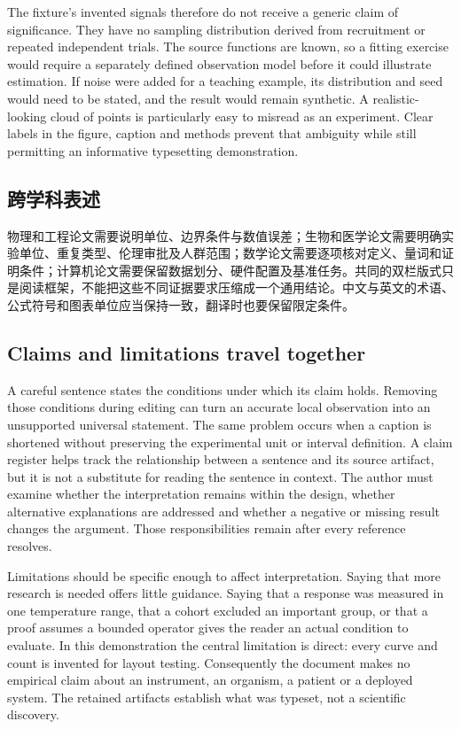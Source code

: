 The fixture's invented signals therefore do not receive a generic claim of significance. They have no sampling distribution derived from recruitment or repeated independent trials. The source functions are known, so a fitting exercise would require a separately defined observation model before it could illustrate estimation. If noise were added for a teaching example, its distribution and seed would need to be stated, and the result would remain synthetic. A realistic-looking cloud of points is particularly easy to misread as an experiment. Clear labels in the figure, caption and methods prevent that ambiguity while still permitting an informative typesetting demonstration.

\ifdefined\sciencebilingual
\subsection{跨学科表述}
物理和工程论文需要说明单位、边界条件与数值误差；生物和医学论文需要明确实验单位、重复类型、伦理审批及人群范围；数学论文需要逐项核对定义、量词和证明条件；计算机论文需要保留数据划分、硬件配置及基准任务。共同的双栏版式只是阅读框架，不能把这些不同证据要求压缩成一个通用结论。中文与英文的术语、公式符号和图表单位应当保持一致，翻译时也要保留限定条件。
\fi

\subsection{Claims and limitations travel together}
A careful sentence states the conditions under which its claim holds. Removing those conditions during editing can turn an accurate local observation into an unsupported universal statement. The same problem occurs when a caption is shortened without preserving the experimental unit or interval definition. A claim register helps track the relationship between a sentence and its source artifact, but it is not a substitute for reading the sentence in context. The author must examine whether the interpretation remains within the design, whether alternative explanations are addressed and whether a negative or missing result changes the argument. Those responsibilities remain after every reference resolves.

Limitations should be specific enough to affect interpretation. Saying that more research is needed offers little guidance. Saying that a response was measured in one temperature range, that a cohort excluded an important group, or that a proof assumes a bounded operator gives the reader an actual condition to evaluate. In this demonstration the central limitation is direct: every curve and count is invented for layout testing. Consequently the document makes no empirical claim about an instrument, an organism, a patient or a deployed system. The retained artifacts establish what was typeset, not a scientific discovery.

